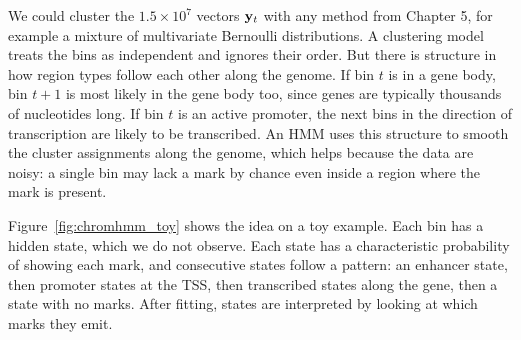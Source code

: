 We could cluster the $1.5\times 10^7$ vectors $\mathbf{y}_t$ with any method from Chapter 5, for example a mixture of multivariate Bernoulli distributions. A clustering model treats the bins as independent and ignores their order. But there is structure in how region types follow each other along the genome. If bin $t$ is in a gene body, bin $t+1$ is most likely in the gene body too, since genes are typically thousands of nucleotides long. If bin $t$ is an active promoter, the next bins in the direction of transcription are likely to be transcribed. An HMM uses this structure to smooth the cluster assignments along the genome, which helps because the data are noisy: a single bin may lack a mark by chance even inside a region where the mark is present.

Figure~\ref{fig:chromhmm_toy} shows the idea on a toy example. Each bin has a hidden state, which we do not observe. Each state has a characteristic probability of showing each mark, and consecutive states follow a pattern: an enhancer state, then promoter states at the TSS, then transcribed states along the gene, then a state with no marks. After fitting, states are interpreted by looking at which marks they emit.

